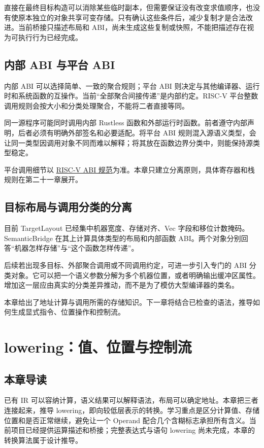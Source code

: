 直接在最终目标构造可以消除某些临时副本，但需要保证没有改变求值顺序，也没有使原本独立的对象共享可变存储。只有确认这些条件后，减少复制才是合法改进。当前桥接只描述布局和 ABI，尚未生成这些复制或快照，不能把描述存在视为可执行行为已经完成。

\section{内部 ABI 与平台 ABI}
内部 ABI 可以选择简单、一致的聚合规则；平台 ABI 则决定与其他编译器、运行时和系统函数的互操作。当前“全部聚合间接传递”是内部约定。RISC-V 平台整数调用规则会按大小和分类处理聚合，不能将二者直接等同。

同一源程序可能同时调用内部 Rustless 函数和外部运行时函数。前者遵守内部声明，后者必须有明确外部签名和必要适配。将平台 ABI 规则混入源语义类型，会让同一类型因调用对象不同而难以解释；将其放在函数边界分类中，则能保持源类型稳定。

平台调用细节以 \href{https://riscv-non-isa.github.io/riscv-elf-psabi-doc/}{RISC-V ABI 规范}为准。本章只建立分离原则，具体寄存器和栈规则在第二十一章展开。

\section{目标布局与调用分类的分离}
目前 TargetLayout 已经集中机器宽度、存储对齐、Vec 字段和移位计数掩码。SemanticBridge 在其上计算具体类型的布局和内部函数 ABI。两个对象分别回答“机器怎样存储”与“这个函数怎样传递”。

后续若出现多目标、外部聚合调用或不同调用约定，可进一步引入专门的 ABI 分类对象。它可以把一个语义参数分解为多个机器位置，或者明确输出缓冲区属性。增加这一层应由真实的分类差异推动，而不是为了模仿大型编译器的类名。

本章给出了地址计算与调用所需的存储知识。下一章将结合已检查的语法，推导如何生成显式指令、位置操作和控制流。

\chapter{lowering：值、位置与控制流}
\label{chap:lowering}
\section*{本章导读}
已有 IR 可以容纳计算，语义结果可以解释语法，布局可以确定地址。本章把三者连接起来，推导 lowering，即向较低层表示的转换。学习重点是区分计算值、存储位置和是否正常继续，避免让一个 Operand 配合几个含糊标志承担所有含义。当前项目已经提供运算描述和桥接；完整表达式与语句 lowering 尚未完成，本章的转换算法属于设计推导。

